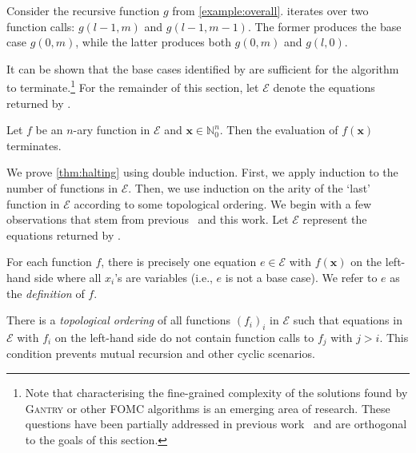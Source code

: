 \documentclass[a4paper,UKenglish,cleveref, autoref, thm-restate]{lipics-v2021}
\newcommand{\Cranetwo}{\textsc{Gantry}}
\begin{document}
\begin{example}
  Consider the recursive function $g$ from \cref{example:overall}.
  \FindBaseCases iterates over two function calls: $g(l-1, m)$ and
  $g(l-1, m-1)$. The former produces the base case $g(0, m)$, while the latter
  produces both $g(0, m)$ and $g(l, 0)$.
\end{example}

It can be shown that the base cases identified by \FindBaseCases are sufficient
for the algorithm to terminate.\footnote{Note that characterising the
  fine-grained complexity of the solutions found by \Cranetwo{} or other FOMC
  algorithms is an emerging area of research. These questions have been
  partially addressed in previous
  work~\cite{DBLP:conf/kr/DilkasB23,tóth2024complexityweightedfirstordermodel}
  and are orthogonal to the goals of this section.} For the remainder of this
section, let $\mathcal{E}$ denote the equations returned by
\CompileWithBaseCases.

\begin{theorem}[Termination]\label{thm:halting}
  Let $f$ be an $n$-ary function in $\mathcal{E}$ and
  $\mathbf{x} \in \mathbb{N}_{0}^{n}$. Then the evaluation of $f(\mathbf{x})$
  terminates.
\end{theorem}

We prove \cref{thm:halting} using double induction. First, we apply induction to
the number of functions in $\mathcal{E}$. Then, we use induction on the arity of
the `last' function in $\mathcal{E}$ according to some topological ordering. We
begin with a few observations that stem from
previous~\cite{DBLP:conf/kr/DilkasB23,DBLP:conf/ijcai/BroeckTMDR11} and this
work. Let $\mathcal{E}$ represent the equations returned by
\CompileWithBaseCases.

\begin{observation}\label{assumption1}
  For each function $f$, there is precisely one equation $e \in \mathcal{E}$
  with $f(\mathbf{x})$ on the left-hand side where all $x_{i}$'s are variables
  (i.e., $e$ is not a base case). We refer to $e$ as the \emph{definition} of
  $f$.
\end{observation}

\begin{observation}\label{assumption2}
  There is a \emph{topological ordering} of all functions ${(f_{i})}_{i}$ in
  $\mathcal{E}$ such that equations in $\mathcal{E}$ with $f_{i}$ on the
  left-hand side do not contain function calls to $f_{j}$ with $j > i$. This
  condition prevents mutual recursion and other cyclic scenarios.
\end{observation}
\end{document}
